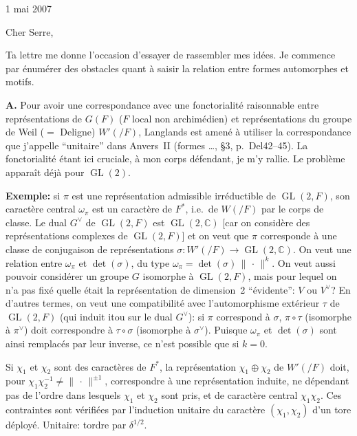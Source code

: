 \documentclass[11pt,a4paper]{article}
\theoremstyle{plain}
\theoremstyle{definition}
\DeclareMathOperator{\GL}{GL}
\newcommand{\norm}[1]{\lVert#1\rVert}
\begin{document}
\begin{flushright}
1 mai 2007
\end{flushright}

\medskip
\noindent Cher Serre,

\smallskip
Ta lettre me donne l'occasion d'essayer de rassembler mes id\'{e}es. Je commence par
\'{e}num\'{e}rer des obstacles quant \`{a} saisir la relation entre formes automorphes et motifs.

\bigskip
\noindent \textbf{A.} Pour avoir une correspondance avec une fonctorialit\'{e} raisonnable entre repr\'{e}sentations de
$G(F)$ ($F$ local non archim\'{e}dien) et repr\'{e}sentations du groupe de Weil ($=$ Deligne) $W'(/F)$,
Langlands est amen\'{e} \`{a} utiliser la correspondance que j'appelle ``unitaire'' dans Anvers~II
(formes \ldots, \S3, p.~Del42--45). La fonctorialit\'{e} \'{e}tant ici cruciale, \`{a} mon corps d\'{e}fendant, je
m'y rallie. Le probl\`{e}me appara\^{i}t d\'{e}j\`{a} pour $\GL(2)$.

\smallskip
\textbf{Exemple:} si $\pi$ est une repr\'{e}sentation admissible irr\'{e}ductible de $\GL(2,F)$, son caract\`{e}re central $\omega_\pi$ est un caract\`{e}re de $F^*$, i.e.~de $W(/F)$ par le corps de classe. Le dual $G^\vee$ de $\GL(2,F)$ est $\GL(2,\mathbb C)$ [car on consid\`{e}re des repr\'{e}sentations complexes de $\GL(2,F)$] et on veut que $\pi$ corresponde \`{a} une classe de conjugaison de repr\'{e}sentations $\sigma \colon W'(/F) \to \GL(2,\mathbb C)$. On veut une relation entre $\omega_\pi$ et $\det(\sigma)$, du type $\omega_\pi = \det(\sigma)\,\norm{\,\cdot\,}^k$. On veut aussi pouvoir consid\'{e}rer un groupe $G$ isomorphe \`{a} $\GL(2,F)$, mais pour lequel on n'a pas fix\'{e} quelle \'{e}tait la repr\'{e}sentation de dimension~2 ``\'{e}vidente'': $V$ ou $V^\vee$? En d'autres termes, on veut une compatibilit\'{e} avec l'automorphisme ext\'{e}rieur $\tau$ de $\GL(2,F)$ (qui induit itou sur le dual $G^\vee$): si $\pi$ correspond \`{a} $\sigma$, $\pi \circ \tau$ (isomorphe \`{a} $\pi^\vee$) doit correspondre \`{a} $\tau \circ \sigma$ (isomorphe \`{a} $\sigma^\vee$). Puisque $\omega_\pi$ et $\det(\sigma)$ sont ainsi remplac\'{e}s par leur inverse, ce n'est possible que si $k=0$.

Si $\chi_1$ et $\chi_2$ sont des caract\`{e}res de $F^*$, la repr\'{e}sentation $\chi_1 \oplus \chi_2$ de $W'(/F)$ doit, pour $\chi_1\chi_2^{-1} \neq \norm{\,\cdot\,}^{\pm 1}$, correspondre \`{a} une repr\'{e}sentation induite, ne d\'{e}pendant pas de l'ordre dans lesquels $\chi_1$ et $\chi_2$ sont pris, et de caract\`{e}re central $\chi_1\chi_2$. Ces contraintes sont v\'{e}rifi\'{e}es par l'induction unitaire du caract\`{e}re $(\chi_1,\chi_2)$ d'un tore d\'{e}ploy\'{e}. Unitaire: tordre par $\delta^{1/2}$.
\end{document}
